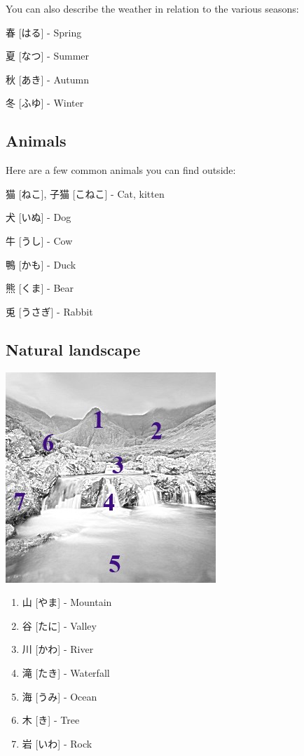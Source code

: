 \documentclass{article}
\begin{document}
\begin{CJK}{UTF8}{min}
\begin{multicols*}{3}
You can also describe the weather in relation to the various seasons:

\begin{colorize}
\item 春 [はる] - Spring
\item 夏 [なつ] - Summer
\item 秋 [あき] - Autumn
\item 冬 [ふゆ] - Winter
\end{colorize}

\subsection{Animals}

Here are a few common animals you can find outside:

\begin{colorize}
\item 猫 [ねこ], 子猫 [こねこ] - Cat, kitten
\item 犬 [いぬ] - Dog
\item 牛 [うし] - Cow
\item 鴨 [かも] - Duck
\item 熊 [くま] - Bear
\item 兎 [うさぎ] - Rabbit
\end{colorize}

\subsection{Natural landscape}

\includegraphics{nature}

\begin{enumerate}
\item 山 [やま] - Mountain
\item 谷 [たに] - Valley
\item 川 [かわ] - River
\item 滝 [たき] - Waterfall
\item 海 [うみ] - Ocean
\item 木 [き] - Tree
\item 岩 [いわ] - Rock
\end{enumerate}


\end{multicols*}
\end{CJK}
\end{document}
